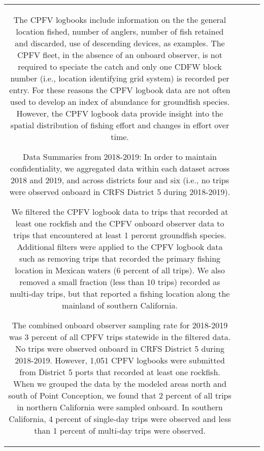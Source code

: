 \documentclass[11pt,
  letterpaper,
]{article}
\begin{document}
\begin{longtable}[t]{c>{\centering\arraybackslash}p{2cm}>{\centering\arraybackslash}p{2cm}>{\centering\arraybackslash}p{2cm}}
The CPFV logbooks include information on the the general location fished, number of anglers, number of fish retained and discarded, use of descending devices, as examples. The CPFV fleet, in the absence of an onboard observer, is not required to speciate the catch and only one CDFW block number (i.e., location identifying grid system) is recorded per entry. For these reasons the CPFV logbook data are not often used to develop an index of abundance for groundfish species. However, the CPFV logbook data provide insight into the spatial distribution of fishing effort and changes in effort over time.

Data Summaries from 2018-2019: In order to maintain confidentiality, we aggregated data within each dataset across 2018 and 2019, and across districts four and six (i.e., no trips were observed onboard in CRFS District 5 during 2018-2019).

We filtered the CPFV logbook data to trips that recorded at least one rockfish and the CPFV onboard observer data to trips that encountered at least 1 percent groundfish species. Additional filters were applied to the CPFV logbook data such as removing trips that recorded the primary fishing location in Mexican waters (6 percent of all trips). We also removed a small fraction (less than 10 trips) recorded as multi-day trips, but that reported a fishing location along the mainland of southern California.

The combined onboard observer sampling rate for 2018-2019 was 3 percent of all CPFV trips statewide in the filtered data. No trips were observed onboard in CRFS District 5 during 2018-2019. However, 1,051 CPFV logbooks were submitted from District 5 ports that recorded at least one rockfish. When we grouped the data by the modeled areas north and south of Point Conception, we found that 2 percent of all trips in northern California were sampled onboard. In southern California, 4 percent of single-day trips were observed and less than 1 percent of multi-day trips were observed.


\end{longtable}
\end{document}
